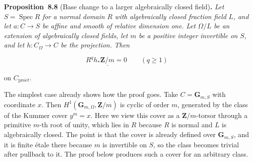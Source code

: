 \documentclass[11pt]{article}
\newenvironment{bpstatement}[2]{\par\addvspace{0.6\baselineskip}\noindent\textbf{#1}#2\textbf{.}\enspace\ignorespaces}
  {\par\addvspace{0.4\baselineskip}}
\newenvironment{bpstatementit}[2]{\begin{bpstatement}{#1}{#2}\itshape\ignorespaces}{\end{bpstatement}}
\begin{document}
\label{bp32}%
\begin{bpstatementit}{Proposition~8.8}{ (Base change to a larger algebraically closed field)}
Let \(S=\operatorname{Spec}R\) for a normal domain \(R\) with algebraically closed fraction field \(L\), and let \(a:C\to S\) be affine and smooth of relative dimension one. Let \(\Omega/L\) be an extension of algebraically closed fields, let \(m\) be a positive integer invertible on \(S\), and let \(h:C_\Omega\to C\) be the projection. Then

\[
R^qh_*\underline{\mathbf Z/m}=0\qquad(q\geq1)
\]

on \(C_{\mathrm{pro}\acute{e}t}\).
\end{bpstatementit}

\label{bp33}%
The simplest case already shows how the proof goes. Take \(C=\mathbf G_{m,S}\) with coordinate \(x\). Then \(H^1(\mathbf G_{m,\Omega},\mathbf Z/m)\) is cyclic of order \(m\), generated by the class of the Kummer cover \(y^m=x\). Here we view this cover as a \(\mathbf Z/m\)-torsor through a primitive \(m\)-th root of unity, which lies in \(R\) because \(R\) is normal and \(L\) is algebraically closed. The point is that the cover is already defined over \(\mathbf G_{m,S}\), and it is finite étale there because \(m\) is invertible on \(S\), so the class becomes trivial after pullback to it. The proof below produces such a cover for an arbitrary class.
\end{document}
